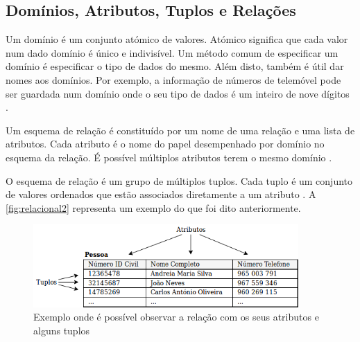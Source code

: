 \documentclass[11pt,twoside,a4paper]{report}
\begin{document}
\subsection{Domínios, Atributos, Tuplos e Relações}
Um domínio é um conjunto atómico de valores. Atómico significa que cada valor num dado domínio é único e indivisível. Um método comum de especificar um domínio é especificar o tipo de dados do mesmo. Além disto, também é útil dar nomes aos domínios. Por exemplo, a informação de números de telemóvel pode ser guardada num domínio onde o seu tipo de dados é um inteiro de nove dígitos \cite{Elmasri:2010:FDS:1855347}.\par
Um esquema de relação é constituído por um nome de uma relação e uma lista de atributos. Cada atributo é o nome do papel desempenhado por domínio no esquema da relação. É possível múltiplos atributos terem o mesmo domínio \cite{Elmasri:2010:FDS:1855347}.\par 
O esquema de relação é um grupo de múltiplos tuplos. Cada tuplo é um conjunto de valores ordenados que estão associados diretamente a um atributo \cite{Elmasri:2010:FDS:1855347}. A \autoref{fig:relacional2} representa um exemplo do que foi dito anteriormente.
\vspace{1cm}
\begin{figure}[H]
	\hspace{-2cm}
	
		\includegraphics[width=0.9\textwidth]{exemplo_relacional} %
		\caption[Exemplo de atributos e tuplos]{Exemplo onde é possível observar a relação com os seus atributos e alguns tuplos}
		\label{fig:relacional2}
	
\end{figure}

\newpage
\end{document}
